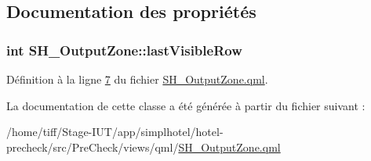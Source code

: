 \subsection{Documentation des propriétés}
\hypertarget{classSH__OutputZone_ae324bcdd20ad4a9e435678d045964dc9}{
\subsubsection[{last\-Visible\-Row}]{\setlength{\rightskip}{0pt plus 5cm}int S\-H\-\_\-\-Output\-Zone\-::last\-Visible\-Row}}\label{classSH__OutputZone_ae324bcdd20ad4a9e435678d045964dc9}


Définition à la ligne \hyperlink{SH__OutputZone_8qml_source_l00007}{7} du fichier \hyperlink{SH__OutputZone_8qml_source}{S\-H\-\_\-\-Output\-Zone.\-qml}.



La documentation de cette classe a été générée à partir du fichier suivant \-:\begin{DoxyCompactItemize}
\item 
/home/tiff/\-Stage-\/\-I\-U\-T/app/simplhotel/hotel-\/precheck/src/\-Pre\-Check/views/qml/\hyperlink{SH__OutputZone_8qml}{S\-H\-\_\-\-Output\-Zone.\-qml}\end{DoxyCompactItemize}
